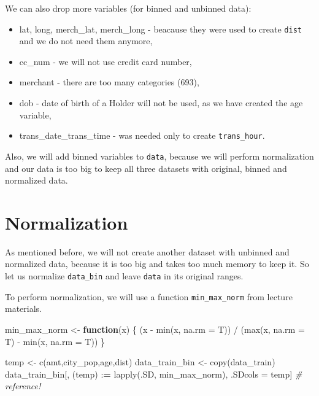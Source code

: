 \documentclass[
]{report}
\newenvironment{Shaded}{\begin{snugshade}}{\end{snugshade}}
\newcommand{\AttributeTok}[1]{\textcolor[rgb]{0.77,0.63,0.00}{#1}}
\newcommand{\CommentTok}[1]{\textcolor[rgb]{0.56,0.35,0.01}{\textit{#1}}}
\newcommand{\ControlFlowTok}[1]{\textcolor[rgb]{0.13,0.29,0.53}{\textbf{#1}}}
\newcommand{\ErrorTok}[1]{\textcolor[rgb]{0.64,0.00,0.00}{\textbf{#1}}}
\newcommand{\FunctionTok}[1]{\textcolor[rgb]{0.00,0.00,0.00}{#1}}
\newcommand{\NormalTok}[1]{#1}
\newcommand{\OtherTok}[1]{\textcolor[rgb]{0.56,0.35,0.01}{#1}}
\newcommand{\SpecialCharTok}[1]{\textcolor[rgb]{0.00,0.00,0.00}{#1}}
\newcommand{\StringTok}[1]{\textcolor[rgb]{0.31,0.60,0.02}{#1}}
\providecommand{\tightlist}{%
  \setlength{\itemsep}{0pt}\setlength{\parskip}{0pt}}
\begin{document}
We can also drop more variables (for binned and unbinned data):

\begin{itemize}
\tightlist
\item
  lat, long, merch\_lat, merch\_long - beacause they were used to create
  \texttt{dist} and we do not need them anymore,
\item
  cc\_num - we will not use credit card number,
\item
  merchant - there are too many categories (693),
\item
  dob - date of birth of a Holder will not be used, as we have created
  the age variable,
\item
  trans\_date\_trans\_time - was needed only to create
  \texttt{trans\_hour}.
\end{itemize}

Also, we will add binned variables to \texttt{data}, because we will
perform normalization and our data is too big to keep all three datasets
with original, binned and normalized data.

\hypertarget{normalization}{%
\section{Normalization}\label{normalization}}

As mentioned before, we will not create another dataset with unbinned
and normalized data, because it is too big and takes too much memory to
keep it. So let us normalize \texttt{data\_bin} and leave \texttt{data}
in its original ranges.

To perform normalization, we will use a function \texttt{min\_max\_norm}
from lecture materials.

\begin{Shaded}
\begin{Highlighting}[]
\NormalTok{min\_max\_norm }\OtherTok{\textless{}{-}} \ControlFlowTok{function}\NormalTok{(x) \{}
\NormalTok{  (x }\SpecialCharTok{{-}} \FunctionTok{min}\NormalTok{(x, }\AttributeTok{na.rm =}\NormalTok{ T)) }\SpecialCharTok{/}\NormalTok{ (}\FunctionTok{max}\NormalTok{(x, }\AttributeTok{na.rm =}\NormalTok{ T) }\SpecialCharTok{{-}} \FunctionTok{min}\NormalTok{(x, }\AttributeTok{na.rm =}\NormalTok{ T))}
\NormalTok{\}}

\NormalTok{temp }\OtherTok{\textless{}{-}} \FunctionTok{c}\NormalTok{(}\StringTok{\textquotesingle{}amt\textquotesingle{}}\NormalTok{,}\StringTok{\textquotesingle{}city\_pop\textquotesingle{}}\NormalTok{,}\StringTok{\textquotesingle{}age\textquotesingle{}}\NormalTok{,}\StringTok{\textquotesingle{}dist\textquotesingle{}}\NormalTok{)}
\NormalTok{data\_train\_bin }\OtherTok{\textless{}{-}} \FunctionTok{copy}\NormalTok{(data\_train)}
\NormalTok{data\_train\_bin[, (temp) }\SpecialCharTok{:}\ErrorTok{=} \FunctionTok{lapply}\NormalTok{(.SD, min\_max\_norm), .SDcols }\OtherTok{=}\NormalTok{ temp] }\CommentTok{\# reference!}
\end{Highlighting}
\end{Shaded}
\end{document}

